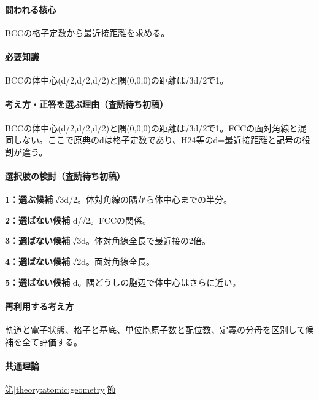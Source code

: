 \paragraph{問われる核心} BCCの格子定数から最近接距離を求める。

\paragraph{必要知識} BCCの体中心(d/2,d/2,d/2)と隅(0,0,0)の距離は√3d/2で1。

\paragraph{考え方・正答を選ぶ理由（査読待ち初稿）} BCCの体中心(d/2,d/2,d/2)と隅(0,0,0)の距離は√3d/2で1。FCCの面対角線と混同しない。ここで原典のdは格子定数であり、H24等のd=最近接距離と記号の役割が違う。

\paragraph{選択肢の検討（査読待ち初稿）}\mbox{}\par

\noindent\textbf{1：選ぶ候補} √3d/2。体対角線の隅から体中心までの半分。\par

\noindent\textbf{2：選ばない候補} d/√2。FCCの関係。\par

\noindent\textbf{3：選ばない候補} √3d。体対角線全長で最近接の2倍。\par

\noindent\textbf{4：選ばない候補} √2d。面対角線全長。\par

\noindent\textbf{5：選ばない候補} d。隅どうしの胞辺で体中心はさらに近い。\par

\paragraph{再利用する考え方} 軌道と電子状態、格子と基底、単位胞原子数と配位数、定義の分母を区別して候補を全て評価する。

\paragraph{共通理論} \hyperref[theory:atomic:geometry]{第\ref*{theory:atomic:geometry}節}

